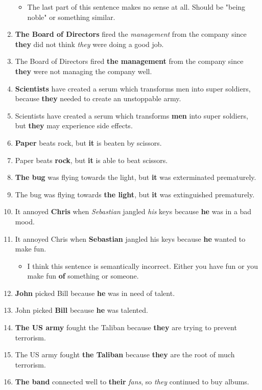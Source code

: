 \documentclass{article}
\begin{document}
\begin{enumerate}
		\begin{itemize}
			\item The last part of this sentence makes no sense at all. Should be "being noble" or something similar.
		\end{itemize}
	\item {\bf The Board of Directors} fired the {\it management} from the company since {\bf they} did not think {\it they} were doing a good job.
	\item The Board of Directors fired {\bf the management} from the company since {\bf they} were not managing the company well.
	\item {\bf Scientists} have created a serum which transforms men into super soldiers, because {\bf they} needed to create an unstoppable army.
	\item Scientists have created a serum which transforms {\bf men} into super soldiers, but {\bf they} may experience side effects.
	\item {\bf Paper} beats rock, but {\bf it} is beaten by scissors.
	\item Paper beats {\bf rock}, but {\bf it} is able to beat scissors.
	\item {\bf The bug} was flying towards the light, but {\bf it} was exterminated prematurely.
	\item The bug was flying towards {\bf the light}, but {\bf it} was extinguished prematurely.
	\item It annoyed {\bf Chris} when {\it Sebastian} jangled {\it his} keys because {\bf he} was in a bad mood.
	\item It annoyed Chris when {\bf Sebastian} jangled his keys because {\bf he} wanted to make fun.
		\begin{itemize}
			\item I think this sentence is semantically incorrect. Either you have fun or you make fun {\bf of} something or someone.
		\end{itemize}
	\item {\bf John} picked Bill because {\bf he} was in need of talent.
	\item John picked {\bf Bill} because {\bf he} was talented.
	\item {\bf The US army} fought the Taliban because {\bf they} are trying to prevent terrorism.
	\item The US army fought {\bf the Taliban} because {\bf they} are the root of much terrorism.
	\item {\bf The band} connected well to {\bf their} {\it fans}, so {\it they} continued to buy albums.

\end{enumerate}
\end{document}
